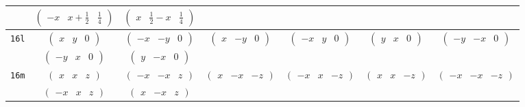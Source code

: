 \documentclass[fleqn,9pt,landscape]{jsarticle}
\begin{document}
\begin{center}
\begin{longtable}{ccccccc}
& $ \begin{pmatrix} - x & x + \frac{1}{2} & \frac{1}{4} \end{pmatrix} $ & $ \begin{pmatrix} x & \frac{1}{2} - x & \frac{1}{4} \end{pmatrix} $ & $  $ & $  $ & $  $ & $  $ \\ \hline
{\tt 16l} & $ \begin{pmatrix} x & y & 0 \end{pmatrix} $ & $ \begin{pmatrix} - x & - y & 0 \end{pmatrix} $ & $ \begin{pmatrix} x & - y & 0 \end{pmatrix} $ & $ \begin{pmatrix} - x & y & 0 \end{pmatrix} $ & $ \begin{pmatrix} y & x & 0 \end{pmatrix} $ & $ \begin{pmatrix} - y & - x & 0 \end{pmatrix} $ \\
& $ \begin{pmatrix} - y & x & 0 \end{pmatrix} $ & $ \begin{pmatrix} y & - x & 0 \end{pmatrix} $ & $  $ & $  $ & $  $ & $  $ \\ \hline
{\tt 16m} & $ \begin{pmatrix} x & x & z \end{pmatrix} $ & $ \begin{pmatrix} - x & - x & z \end{pmatrix} $ & $ \begin{pmatrix} x & - x & - z \end{pmatrix} $ & $ \begin{pmatrix} - x & x & - z \end{pmatrix} $ & $ \begin{pmatrix} x & x & - z \end{pmatrix} $ & $ \begin{pmatrix} - x & - x & - z \end{pmatrix} $ \\
& $ \begin{pmatrix} - x & x & z \end{pmatrix} $ & $ \begin{pmatrix} x & - x & z \end{pmatrix} $ & $  $ & $  $ & $  $ & $  $ \\ \hline

\end{longtable}
\end{center}
\end{document}
